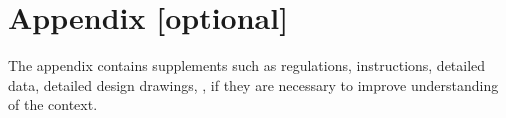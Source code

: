 \chapter{Appendix [optional]}
The appendix contains supplements such as regulations, instructions, detailed data, detailed design drawings, \etc, if they are necessary to improve understanding of the context.